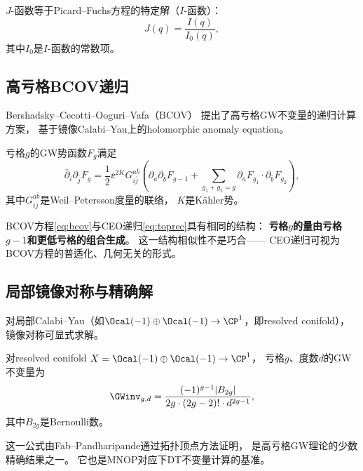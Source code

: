 \begin{theorem}\label{thm:mirror2}
$J$-函数等于Picard--Fuchs方程的特定解（$I$-函数）：
\[
J(q) = \frac{I(q)}{I_0(q)},
\]
其中$I_0$是$I$-函数的常数项。
\end{theorem}

\subsection{高亏格BCOV递归}

Bershadsky--Cecotti--Ooguri--Vafa（BCOV）\cite{BCOV1994}
提出了高亏格GW不变量的递归计算方案，
基于镜像Calabi--Yau上的holomorphic anomaly equation。

\begin{theorem}\label{thm:bcov}
亏格$g$的GW势函数$F_g$满足
\begin{equation}\label{eq:bcov}
\bar\partial_i \partial_{\bar j} F_g
= \frac{1}{2} \ee^{2K} G_{i\bar j}^{a\bar b}
\left( \partial_a \partial_{\bar b} F_{g-1}
+ \sum_{g_1+g_2=g} \partial_a F_{g_1} \cdot \partial_{\bar b} F_{g_2} \right),
\end{equation}
其中$G_{i\bar j}^{a\bar b}$是Weil--Petersson度量的联络，
$K$是Kähler势。
\end{theorem}

BCOV方程\eqref{eq:bcov}与CEO递归\eqref{eq:toprec}具有相同的结构：
\textbf{亏格$g$的量由亏格$g-1$和更低亏格的组合生成}。
这一结构相似性不是巧合——
CEO递归可视为BCOV方程的普适化、几何无关的形式。

\subsection{局部镜像对称与精确解}

对局部Calabi--Yau（如$\Ocal(-1) \oplus \Ocal(-1) \to \CP^1$，即resolved conifold），
镜像对称可显式求解。

\begin{theorem}\label{thm:conifold}
对resolved conifold $X = \Ocal(-1) \oplus \Ocal(-1) \to \CP^1$，
亏格$g$、度数$d$的GW不变量为
\begin{equation}\label{eq:conifold}
\GWinv_{g, d} = \frac{(-1)^{g-1} |B_{2g}|}{2g \cdot (2g-2)! \cdot d^{2g-1}},
\end{equation}
其中$B_{2g}$是Bernoulli数。
\end{theorem}

这一公式由Fab--Pandharipande通过拓扑顶点方法证明，
是高亏格GW理论的少数精确结果之一。
它也是MNOP对应下DT不变量计算的基准。

